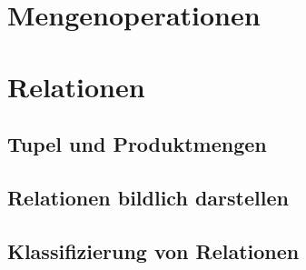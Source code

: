 \section{Mengenoperationen}
\section{Relationen}
\subsection{Tupel und Produktmengen}
\subsection{Relationen bildlich darstellen}
\subsection{Klassifizierung von Relationen}